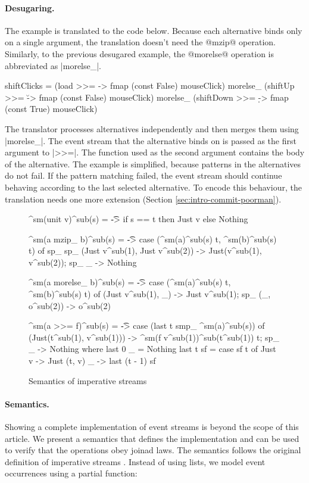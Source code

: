 \documentclass[preprint]{sigplanconf}
\begin{document}
\paragraph{Desugaring.}
The example is translated to the code below. Because each alternative binds only
on a single argument, the translation doesn't need the @mzip@ operation. Similarly, to the 
previous desugared example, the @morelse@ operation is abbreviated as |morelse_|.

\begin{code}
shiftClicks = 
  (load >>= \a -> fmap (const False) mouseClick)  morelse_
  (shiftUp >>= \u -> fmap (const False) mouseClick) morelse_
  (shiftDown >>= \d -> fmap (const True) mouseClick)
\end{code}
The translator processes alternatives independently and then merges them using |morelse_|. The 
event stream that the alternative binds on is passed as the first argument to |>>=|. The function 
used as the second argument contains the body of the alternative. 
The example is simplified, because patterns in the alternatives do not fail. If the pattern matching
failed, the event stream should continue behaving according to the last selected alternative. To
encode this behaviour, the translation needs one more extension (Section \ref{sec:intro-commit-poorman}).

\begin{figure}
\label{fig:imperativestream-semantics}
\begin{code}
^sm(unit v)^sub(s)       = \t -> if s == t then Just v else Nothing

^sm(a mzip_ b)^sub(s)     = \t -> case (^sm(a)^sub(s) t, ^sm(b)^sub(s) t) of
  sp_ sp_  (Just v^sub(1), Just v^sub(2)) -> Just(v^sub(1), v^sub(2)); sp_ _ -> Nothing

^sm(a morelse_ b)^sub(s)  = \t -> case (^sm(a)^sub(s) t, ^sm(b)^sub(s) t) of
           (Just v^sub(1), _) -> Just v^sub(1); sp_ (_, o^sub(2)) -> o^sub(2)

^sm(a >>= f)^sub(s)      = \t -> case (last t smp_ ^sm(a)^sub(s)) of
           (Just(t^sub(1), v^sub(1))) -> ^sm(f v^sub(1))^sub(t^sub(1)) t; sp_ _ -> Nothing
  where  last 0 _   = Nothing
         last t sf  = case sf t of  Just v -> Just (t, v)
                                    _ -> last (t - 1) sf
\end{code}
\caption{Semantics of imperative streams}
\end{figure}

\paragraph{Semantics.} Showing a complete implementation of event streams is beyond the scope of
this article. We present a semantics that defines the implementation and can be used to verify 
that the operations obey joinad laws. The semantics follows the original definition of imperative 
streams \cite{imperative-streams}. Instead of using lists, we model event occurrences using a 
partial function:
\end{document}
